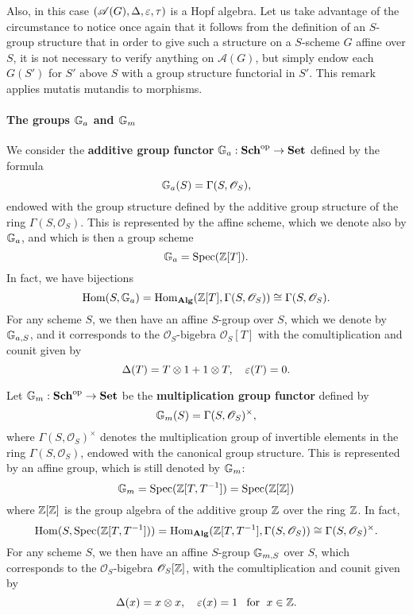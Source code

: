 Also, in this case $(\mathscr{A}(G),\Delta,\varepsilon,\tau)$ is a Hopf algebra. Let us take advantage of the circumstance to notice once again that it follows from the definition of an $S$-group structure that in order to give such a structure on a $S$-scheme $G$ affine over $S$, it is not necessary to verify anything on $\mathscr{A}(G)$, but simply endow each $G(S')$ for $S'$ above $S$ with a group structure functorial in $S'$. This remark applies mutatis mutandis to morphisms.
\paragraph{The groups \texorpdfstring{$\mathbb{G}_a$}{G} and \texorpdfstring{$\mathbb{G}_m$}{G}}\label{scheme group G_a and G_m paragraph}
We consider the \textbf{additive group functor} $\mathbb{G}_a:\mathbf{Sch}^{\mathrm{op}}\to\mathbf{Set}$ defined by the formula
\[\mathbb{G}_a(S)=\Gamma(S,\mathscr{O}_S),\]
endowed with the group structure defined by the additive group structure of the ring $\Gamma(S,\mathscr{O}_S)$. This is represented by the affine scheme, which we denote also by $\mathbb{G}_a$, and which is then a group scheme
\[\mathbb{G}_a=\mathrm{Spec}(\mathbb{Z}[T]).\]
In fact, we have bijections
\[\mathrm{Hom}(S,\mathbb{G}_a)=\mathrm{Hom}_{\mathbf{Alg}}(\mathbb{Z}[T],\Gamma(S,\mathscr{O}_S))\cong\Gamma(S,\mathscr{O}_S).\]
For any scheme $S$, we then have an affine $S$-group over $S$, which we denote by $\mathbb{G}_{a,S}$, and it corresponds to the $\mathscr{O}_S$-bigebra $\mathscr{O}_S[T]$ with the comultiplication and counit given by
\[\Delta(T)=T\otimes 1+1\otimes T,\quad \varepsilon(T)=0.\]

Let $\mathbb{G}_m:\mathbf{Sch}^{\mathrm{op}}\to\mathbf{Set}$ be the \textbf{multiplication group functor} defined by
\[\mathbb{G}_m(S)=\Gamma(S,\mathscr{O}_S)^{\times},\]
where $\Gamma(S,\mathscr{O}_S)^{\times}$ denotes the multiplication group of invertible elements in the ring $\Gamma(S,\mathscr{O}_S)$, endowed with the canonical group structure. This is represented by an affine group, which is still denoted by $\mathbb{G}_m$:
\[\mathbb{G}_m=\mathrm{Spec}(\mathbb{Z}[T,T^{-1}])=\mathrm{Spec}(\mathbb{Z}[\mathbb{Z}])\]
where $\mathbb{Z}[\mathbb{Z}]$ is the group algebra of the additive group $\mathbb{Z}$ over the ring $\mathbb{Z}$. In fact,
\[\mathrm{Hom}(S,\mathrm{Spec}(\mathbb{Z}[T,T^{-1}]))=\mathrm{Hom}_{\mathbf{Alg}}(\mathbb{Z}[T,T^{-1}],\Gamma(S,\mathscr{O}_S))\cong\Gamma(S,\mathscr{O}_S)^\times.\]
For any scheme $S$, we then have an affine $S$-group $\mathbb{G}_{m,S}$ over $S$, which corresponds to the $\mathscr{O}_S$-bigebra $\mathscr{O}_S[\mathbb{Z}]$, with the comultiplication and counit given by
\[\Delta(x)=x\otimes x,\quad \varepsilon(x)=1\hspace{8pt}\text{for}\hspace{6pt} x\in\mathbb{Z}.\]

